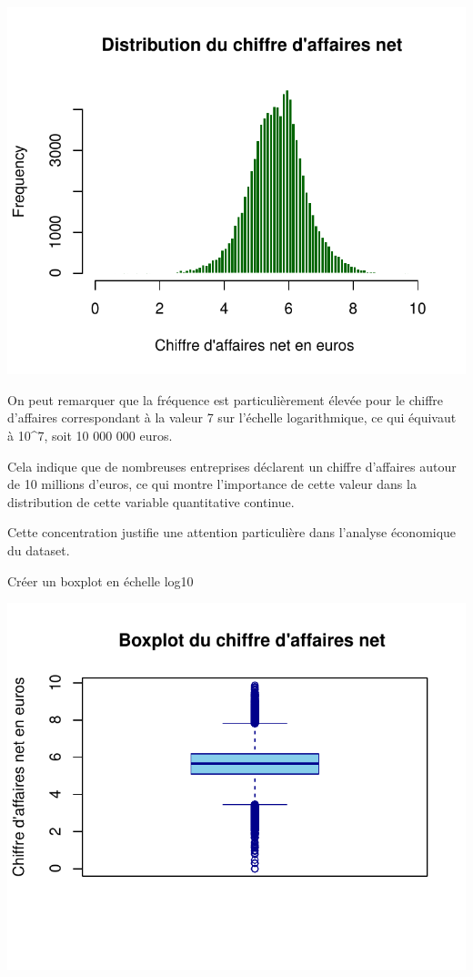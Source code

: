\documentclass[mstat,12pt]{unswthesis}
\begin{document}
\medskip

\includegraphics{TDDT_projet_L_2_files/figure-latex/unnamed-chunk-31-1.pdf}

\medskip

On peut remarquer que la fréquence est particulièrement élevée pour le
chiffre d'affaires correspondant à la valeur 7 sur l'échelle
logarithmique, ce qui équivaut à 10\^{}7, soit 10 000 000 euros.

\medskip

Cela indique que de nombreuses entreprises déclarent un chiffre
d'affaires autour de 10 millions d'euros, ce qui montre l'importance de
cette valeur dans la distribution de cette variable quantitative
continue.

\medskip

Cette concentration justifie une attention particulière dans l'analyse
économique du dataset.

\medskip

Créer un boxplot en échelle log10

\medskip

\includegraphics{TDDT_projet_L_2_files/figure-latex/unnamed-chunk-32-1.pdf}
\end{document}
